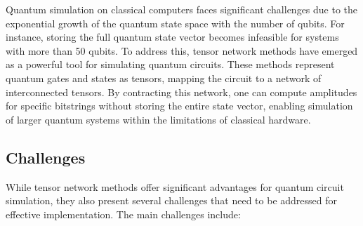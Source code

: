 \documentclass[12pt,oneside,a4paper]{article}
\begin{document}
Quantum simulation on classical computers faces significant challenges due to the exponential growth of the quantum state space with the number of qubits. For instance, storing the full quantum state vector becomes infeasible for systems with more than 50 qubits. To address this, tensor network methods have emerged as a powerful tool for simulating quantum circuits. These methods represent quantum gates and states as tensors, mapping the circuit to a network of interconnected tensors. By contracting this network, one can compute amplitudes for specific bitstrings without storing the entire state vector, enabling simulation of larger quantum systems within the limitations of classical hardware.

\subsection{Challenges}
While tensor network methods offer significant advantages for quantum circuit simulation, they also present several challenges that need to be addressed for effective implementation. The main challenges include:
\end{document}

